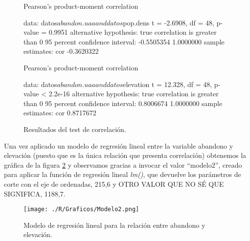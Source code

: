 \documentclass[11pt,a4paper]{article}
\begin{document}
\begin{figure}
\centering
\begin{boxedverbatim}
    Pearson's product-moment correlation

data:  datos$abandon.uaa and datos$pop.dens
t = -2.6908, df = 48, p-value = 0.9951
alternative hypothesis: true correlation is greater than 0
95 percent confidence interval:
 -0.5505354  1.0000000
sample estimates:
       cor 
-0.3620322
\end{boxedverbatim}

\begin{boxedverbatim}
    Pearson's product-moment correlation

data:  datos$abandon.uaa and datos$elevation
t = 12.328, df = 48, p-value < 2.2e-16
alternative hypothesis: true correlation is greater than 0
95 percent confidence interval:
 0.8006674 1.0000000
sample estimates:
       cor 
0.8717672 
\end{boxedverbatim}
\caption{Resultados del test de correlación.}
\label{fig:res.corr}
\end{figure}

Una vez aplicado un modelo de regresión lineal entre la variable abandono y elevación (puesto que es la única relación que presenta correlación) obtenemos la gráfica de la figura \ref{fig:lm2} y observamos gracias a invocar el valor ``modelo2'', creado para aplicar la función de regresión lineal \textit{lm()}, que devuelve los parámetros de corte con el eje de ordenadas, 215,6 y OTRO VALOR QUE NO SÉ QUE SIGNIFICA, 1188,7. 

\begin{figure}
	\centering
	\texttt{[image: ./R/Graficos/Modelo2.png]}
	\caption{Modelo de regresión lineal para la relación entre abandono y elevación.}
	\label{fig:lm2}
\end{figure}
\end{document}
